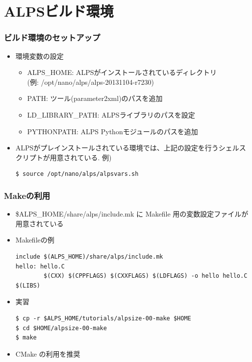 \section{ALPSビルド環境}
\begin{frame}[c,fragile]
  \frametitle{ビルド環境のセットアップ}
  \begin{itemize}
    \setlength{\itemsep}{1em}
  \item 環境変数の設定
    \begin{itemize}
    \item {\color{red} ALPS\_HOME}: ALPSがインストールされているディレクトリ\\ (例: /opt/nano/alps/alps-20131104-r7230)
    \item {\color{red} PATH}: ツール(parameter2xml)のパスを追加
    \item {\color{red} LD\_LIBRARY\_PATH}: ALPSライブラリのパスを設定
    \item {\color{red} PYTHONPATH}: ALPS Pythonモジュールのパスを追加
    \end{itemize}
  \item ALPSがプレインストールされている環境では、上記の設定を行うシェルスクリプトが用意されている. 例)
\begin{lstlisting}
$ source /opt/nano/alps/alpsvars.sh
\end{lstlisting}
  \end{itemize}
\end{frame}

\begin{frame}[c,fragile]
  \frametitle{Makeの利用}
  \begin{itemize}
  \item \$ALPS\_HOME/share/alps/include.mk に Makefile 用の変数設定ファイルが用意されている
  \item Makefileの例
\begin{lstlisting}
include $(ALPS_HOME)/share/alps/include.mk
hello: hello.C
        $(CXX) $(CPPFLAGS) $(CXXFLAGS) $(LDFLAGS) -o hello hello.C $(LIBS)
\end{lstlisting}
  \item 実習
\begin{lstlisting}
$ cp -r $ALPS_HOME/tutorials/alpsize-00-make $HOME
$ cd $HOME/alpsize-00-make
$ make
\end{lstlisting}
  \item {\color{blue} CMake の利用を推奨}
  \end{itemize}
\end{frame}

